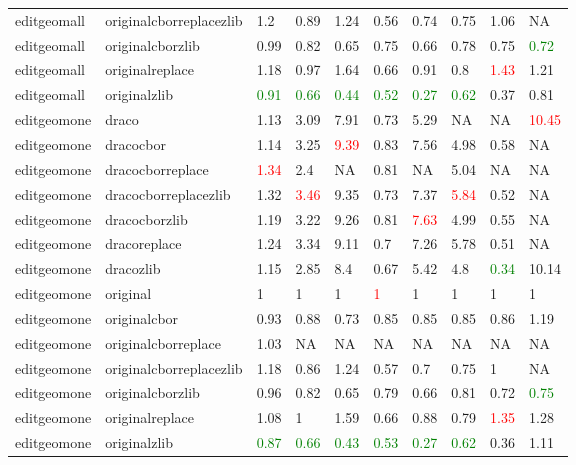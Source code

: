 \begin{landscape}
\begin{longtable}{llllllllll}
editgeomall & originalcborreplacezlib & 1.2 & 0.89 & 1.24 & 0.56 & 0.74 & 0.75 & 1.06 & NA\\
editgeomall & originalcborzlib & 0.99 & 0.82 & 0.65 & 0.75 & 0.66 & 0.78 & 0.75 & \textcolor{green}{0.72}\\
editgeomall & originalreplace & 1.18 & 0.97 & 1.64 & 0.66 & 0.91 & 0.8 & \textcolor{red}{1.43} & 1.21\\
editgeomall & originalzlib & \textcolor{green}{0.91} & \textcolor{green}{0.66} & \textcolor{green}{0.44} & \textcolor{green}{0.52} & \textcolor{green}{0.27} & \textcolor{green}{0.62} & 0.37 & 0.81\\
editgeomone & draco & 1.13 & 3.09 & 7.91 & 0.73 & 5.29 & NA & NA & \textcolor{red}{10.45}\\
editgeomone & dracocbor & 1.14 & 3.25 & \textcolor{red}{9.39} & 0.83 & 7.56 & 4.98 & 0.58 & NA\\
editgeomone & dracocborreplace & \textcolor{red}{1.34} & 2.4 & NA & 0.81 & NA & 5.04 & NA & NA\\
editgeomone & dracocborreplacezlib & 1.32 & \textcolor{red}{3.46} & 9.35 & 0.73 & 7.37 & \textcolor{red}{5.84} & 0.52 & NA\\
editgeomone & dracocborzlib & 1.19 & 3.22 & 9.26 & 0.81 & \textcolor{red}{7.63} & 4.99 & 0.55 & NA\\
editgeomone & dracoreplace & 1.24 & 3.34 & 9.11 & 0.7 & 7.26 & 5.78 & 0.51 & NA\\
editgeomone & dracozlib & 1.15 & 2.85 & 8.4 & 0.67 & 5.42 & 4.8 & \textcolor{green}{0.34} & 10.14\\
editgeomone & original & 1 & 1 & 1 & \textcolor{red}{1} & 1 & 1 & 1 & 1\\
\rowcolor{lightgray}  editgeomone & originalcbor & 0.93 & 0.88 & 0.73 & 0.85 & 0.85 & 0.85 & 0.86 & 1.19\\
\rowcolor{lightgray}  editgeomone & originalcborreplace & 1.03 & NA & NA & NA & NA & NA & NA & NA\\
\rowcolor{lightgray}  editgeomone & originalcborreplacezlib & 1.18 & 0.86 & 1.24 & 0.57 & 0.7 & 0.75 & 1 & NA\\
\rowcolor{lightgray}  editgeomone & originalcborzlib & 0.96 & 0.82 & 0.65 & 0.79 & 0.66 & 0.81 & 0.72 & \textcolor{green}{0.75}\\
\rowcolor{lightgray}  editgeomone & originalreplace & 1.08 & 1 & 1.59 & 0.66 & 0.88 & 0.79 & \textcolor{red}{1.35} & 1.28\\
\rowcolor{lightgray}  editgeomone & originalzlib & \textcolor{green}{0.87} & \textcolor{green}{0.66} & \textcolor{green}{0.43} & \textcolor{green}{0.53} & \textcolor{green}{0.27} & \textcolor{green}{0.62} & 0.36 & 1.11\\

\end{longtable}
\end{landscape}
